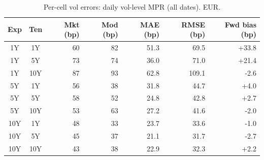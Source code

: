 \begin{table}[H]
\centering
\caption{Per-cell vol errors: daily vol-level MPR (all dates). EUR.}
\label{tab:daily_vol_mpr_per_cell_all}
\small
\begin{tabular}{@{}ccrrrrr@{}}
\toprule
\textbf{Exp} & \textbf{Ten} & \textbf{Mkt (bp)} & \textbf{Mod (bp)} & \textbf{MAE (bp)} & \textbf{RMSE (bp)} & \textbf{Fwd bias (bp)} \\
\midrule
  1Y & 1Y & 60 & 82 & 51.3 & 69.5 & +33.8 \\
  1Y & 5Y & 73 & 74 & 36.0 & 71.0 & +21.4 \\
  1Y & 10Y & 87 & 93 & 62.8 & 109.1 & -2.6 \\
  \midrule
  5Y & 1Y & 56 & 38 & 31.8 & 44.7 & +4.0 \\
  5Y & 5Y & 58 & 52 & 24.8 & 42.8 & +2.7 \\
  5Y & 10Y & 53 & 63 & 27.2 & 41.6 & -2.0 \\
  \midrule
  10Y & 1Y & 48 & 33 & 23.7 & 33.6 & -1.0 \\
  10Y & 5Y & 45 & 37 & 21.1 & 31.7 & -2.7 \\
  10Y & 10Y & 43 & 38 & 22.9 & 32.3 & +2.2 \\
\bottomrule
\end{tabular}
\end{table}